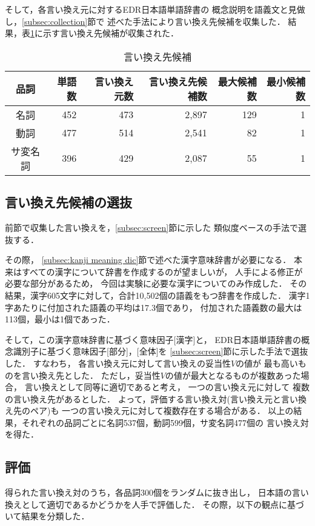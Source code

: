 そして，各言い換え元に対するEDR日本語単語辞書の
概念説明を語義文と見做し，\ref{subsec:collection}節で
述べた手法により言い換え先候補を収集した．
結果，表\ref{cand}に示す言い換え先候補が収集された．

   \begin{table}[t]
	 \caption{\label{cand}言い換え先候補}
	\begin{center}
	 \begin{tabular}{c|r|r|r|r|r} \hline
	  品詞     & 単語数 & 言い換え元数 & 言い換え先候補数 & 最大候補数 & 最小候補数 \\
	  \hline
	  名詞     & 452 & 473 & 2,897 & 129 & 1 \\ 
	  動詞     & 477 & 514 & 2,541 & 82  & 1 \\ 
	  サ変名詞 & 396 & 429 & 2,087 & 55  & 1 \\ 
	  \hline
	 \end{tabular}
	\end{center}
   \end{table}

   \subsection{言い換え先候補の選抜}
\label{subsec:screening}
前節で収集した言い換えを，\ref{subsec:screen}節に示した
類似度ベースの手法で選抜する．

その際，
\ref{subsec:kanji meaning dic}節で述べた漢字意味辞書が必要になる．
本来はすべての漢字について辞書を作成するのが望ましいが，
人手による修正が必要な部分があるため，
今回は実験に必要な漢字についてのみ作成した．
その結果，漢字605文字に対して，合計10,502個の語義をもつ辞書を作成した．
漢字1字あたりに付加された語義の平均は17.3個であり，
付加された語義数の最大は113個，最小は1個であった．

そして，この漢字意味辞書に基づく意味因子[漢字]と，
EDR日本語単語辞書の概念識別子に基づく意味因子[部分]，[全体]を
\ref{subsec:screen}節に示した手法で選抜した．
すなわち，
各言い換え元に対して言い換えの妥当性$V$の値が
最も高いものを言い換え先とした．
ただし，妥当性$V$の値が最大となるものが複数あった場合，
言い換えとして同等に適切であると考え，
一つの言い換え元に対して
複数の言い換え先があるとした．
よって，評価する言い換え対(言い換え元と言い換え先のペア)も
一つの言い換え元に対して複数存在する場合がある．
以上の結果，それぞれの品詞ごとに名詞537個，動詞599個，サ変名詞477個の
言い換え対を得た．

\subsection{評価}
\label{subsec:eval}
得られた言い換え対のうち，各品詞300個をランダムに抜き出し，
日本語の言い換えとして適切であるかどうかを人手で評価した．
その際，以下の観点に基づいて結果を分類した．
	
